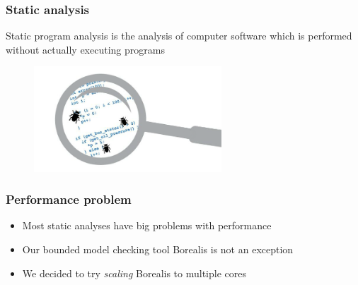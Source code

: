 

\begin{frame}
	\frametitle{Static analysis}

	\begin{block}{}
	\centering
	Static program analysis is the analysis of computer software which is performed without actually executing programs
	\end{block}
		
	\begin{figure}
	\includegraphics[width=70mm]{image/staticAnalysis}
	\end{figure}	
	
\end{frame}



\begin{frame}
	\frametitle{Performance problem}
	\begin{itemize}
		\item Most static analyses have big problems with performance
		\item Our bounded model checking tool Borealis is not an exception
		\item We decided to try \textit{scaling} Borealis to multiple cores
	\end{itemize}
\end{frame}



